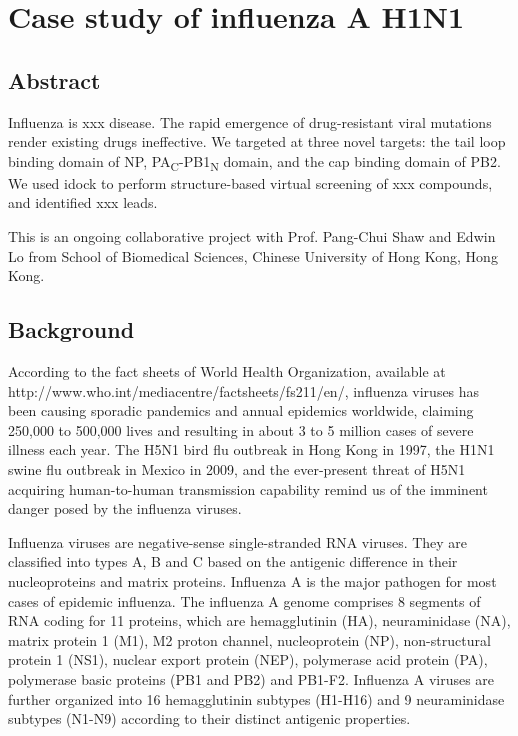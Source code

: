 
\chapter{Case study of influenza A H1N1}
\label{influenza}

\section{Abstract}

Influenza is xxx disease. The rapid emergence of drug-resistant viral mutations render existing drugs ineffective. We targeted at three novel targets: the tail loop binding domain of NP, PA\textsubscript{C}-PB1\textsubscript{N} domain, and the cap binding domain of PB2. We used idock to perform structure-based virtual screening of xxx compounds, and identified xxx leads.

This is an ongoing collaborative project with Prof. Pang-Chui Shaw and Edwin Lo from School of Biomedical Sciences, Chinese University of Hong Kong, Hong Kong.

\section{Background}

According to the fact sheets of World Health Organization, available at http://www.who.int/mediacentre/factsheets/fs211/en/, influenza viruses has been causing sporadic pandemics and annual epidemics worldwide, claiming 250,000 to 500,000 lives and resulting in about 3 to 5 million cases of severe illness each year. The H5N1 bird flu outbreak in Hong Kong in 1997, the H1N1 swine flu outbreak in Mexico in 2009, and the ever-present threat of H5N1 acquiring human-to-human transmission capability remind us of the imminent danger posed by the influenza viruses. 

Influenza viruses are negative-sense single-stranded RNA viruses. They are classified into types A, B and C based on the antigenic difference in their nucleoproteins and matrix proteins. Influenza A is the major pathogen for most cases of epidemic influenza. The influenza A genome comprises 8 segments of RNA coding for 11 proteins, which are hemagglutinin (HA), neuraminidase (NA), matrix protein 1 (M1), M2 proton channel, nucleoprotein (NP), non-structural protein 1 (NS1), nuclear export protein (NEP), polymerase acid protein (PA), polymerase basic proteins (PB1 and PB2) and PB1-F2. Influenza A viruses are further organized into 16 hemagglutinin subtypes (H1-H16) and 9 neuraminidase subtypes (N1-N9) according to their distinct antigenic properties.

